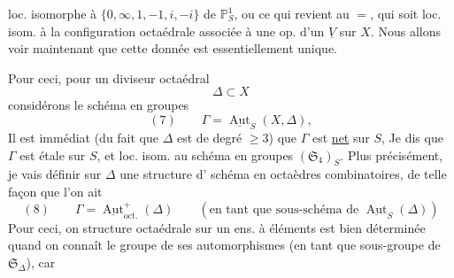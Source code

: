 loc. isomorphe à $\{0,\infty,1,-1,i,-i\}$ de $\mathbb P^1_S$, ou ce qui revient au $=$, qui soit loc. isom. à la configuration octaédrale associée à une op.  d'un $\underline V$ sur $X$. Nous allons voir maintenant que cette donnée est essentiellement unique.

Pour ceci, pour un diviseur octaédral \deleted{$\unsure{\Delta}$}
\[
\Delta\subset X
\]
considérons le schéma en groupes
\[
(7)\qquad\Gamma=\underline{\operatorname{Aut}}_S(X,\Delta),
\]
Il est immédiat (du fait que $\Delta$ est de degré $\geq3$) que $\Gamma$  est \uline{net} sur $S$, Je dis que $\Gamma$ est étale sur $S$, et loc. isom. au schéma en groupes $(\mathfrak S_4)_S$. Plus précisément, je vais définir sur $\Delta$  une structure d' schéma en octaèdres combinatoires, de telle façon que l'on ait
\[
(8)\qquad\Gamma=\underline{\operatorname{Aut}}^+_{\mathrm{oct.}}(\Delta)
\qquad(\text{en tant que sous-schéma de }\underline{\operatorname{Aut}}_S(\Delta))
\]
Pour ceci, on   structure octaédrale sur un ens. à  éléments est bien déterminée quand on connaît le groupe de ses automorphismes  (en tant que sous-groupe de $\mathfrak S_\Delta$), car
